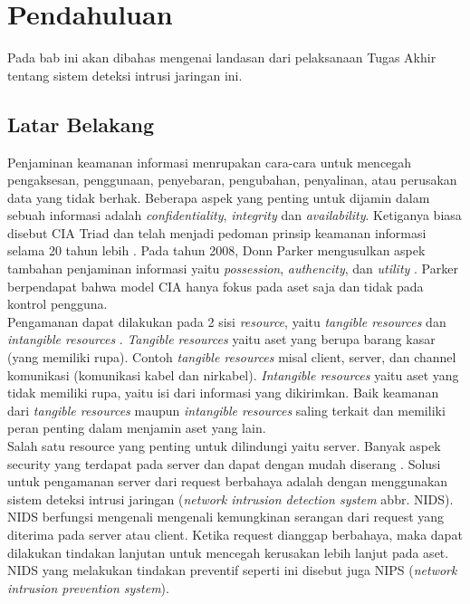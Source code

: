 \chapter{Pendahuluan}

Pada bab ini akan dibahas mengenai landasan dari pelaksanaan Tugas Akhir tentang sistem deteksi intrusi jaringan ini.

\section{Latar Belakang}

Penjaminan keamanan informasi menrupakan cara-cara untuk mencegah pengaksesan, penggunaan, penyebaran, pengubahan, penyalinan, atau perusakan data yang tidak berhak. Beberapa aspek yang penting untuk dijamin dalam sebuah informasi adalah \emph{confidentiality}, \emph{integrity} dan \emph{availability}. Ketiganya biasa disebut CIA Triad dan telah menjadi pedoman prinsip keamanan informasi selama 20 tahun lebih \parencite{perrin2008}. Pada tahun 2008, Donn Parker mengusulkan aspek tambahan penjaminan informasi yaitu \emph{possession}, \emph{authencity}, dan \emph{utility} \parencite{parker1998}. Parker berpendapat bahwa model CIA hanya fokus pada aset saja dan tidak pada kontrol pengguna. \\
Pengamanan dapat dilakukan pada 2 sisi \emph{resource}, yaitu \emph{tangible resources} dan \emph{intangible resources} \parencite{kizza2013}. \emph{Tangible resources} yaitu aset yang berupa barang kasar (yang memiliki rupa). Contoh \emph{tangible resources} misal client, server, dan channel komunikasi (komunikasi kabel dan nirkabel). \emph{Intangible resources} yaitu aset yang tidak memiliki rupa, yaitu isi dari informasi yang dikirimkan. Baik keamanan dari \emph{tangible resources} maupun \emph{intangible resources} saling terkait dan memiliki peran penting dalam menjamin aset yang lain. \\
Salah satu resource yang penting untuk dilindungi yaitu server. Banyak aspek security yang terdapat pada server dan dapat dengan mudah diserang \parencite{owasp2013}. Solusi untuk pengamanan server dari request berbahaya adalah dengan menggunakan sistem deteksi intrusi jaringan (\emph{network intrusion detection system} abbr. NIDS). NIDS berfungsi mengenali mengenali kemungkinan serangan dari request yang diterima pada server atau client. Ketika request dianggap berbahaya, maka dapat dilakukan tindakan lanjutan untuk mencegah kerusakan lebih lanjut pada aset. NIDS yang melakukan tindakan preventif seperti ini disebut juga NIPS (\emph{network intrusion prevention system}). \\
